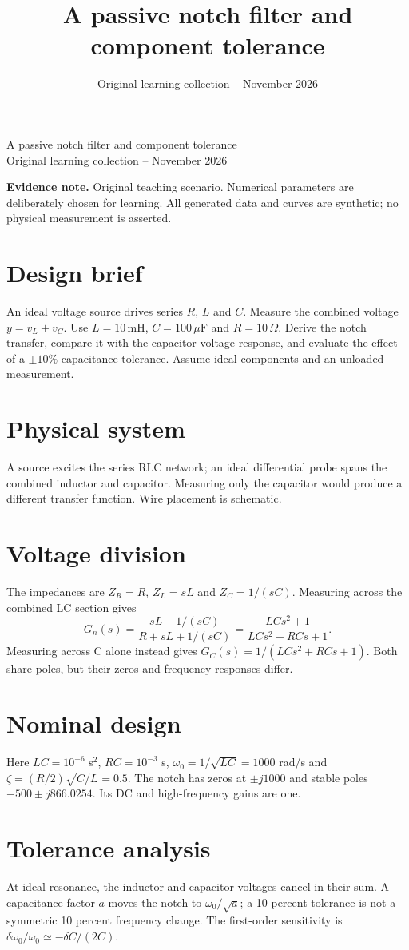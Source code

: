 \documentclass[10pt,a4paper]{article}
\title{\color{ink}A passive notch filter and component tolerance}
\author{}
\date{Original learning collection -- November 2026}
\begin{document}
\begin{center}{\LARGE\color{ink}A passive notch filter and component tolerance}\\[5pt]{\small Original learning collection -- November 2026}\end{center}

\textbf{Evidence note.} Original teaching scenario. Numerical parameters are deliberately chosen for learning. All generated data and curves are synthetic; no physical measurement is asserted.
\section{Design brief}
An ideal voltage source drives series $R$, $L$ and $C$. Measure the combined voltage $y=v_L+v_C$. Use $L=10\,\mathrm{mH}$, $C=100\,\mu\mathrm{F}$ and $R=10\,\Omega$. Derive the notch transfer, compare it with the capacitor-voltage response, and evaluate the effect of a $\pm10\%$ capacitance tolerance. Assume ideal components and an unloaded measurement.
\section{Physical system}
\begin{center}\resizebox{.88\linewidth}{!}{}\par{\small A source excites the series RLC network; an ideal differential probe spans the combined inductor and capacitor. Measuring only the capacitor would produce a different transfer function. Wire placement is schematic.}\end{center}
\section{Voltage division}
The impedances are $Z_R=R$, $Z_L=sL$ and $Z_C=1/(sC)$. Measuring across the combined LC section gives
\[G_n(s)=\frac{sL+1/(sC)}{R+sL+1/(sC)}=\frac{LCs^2+1}{LCs^2+RCs+1}.\]
Measuring across C alone instead gives $G_C(s)=1/(LCs^2+RCs+1)$. Both share poles, but their zeros and frequency responses differ.
\section{Nominal design}
Here $LC=10^{-6}$ s$^2$, $RC=10^{-3}$ s, $\omega_0=1/\sqrt{LC}=1000$ rad/s and $\zeta=(R/2)\sqrt{C/L}=0.5$. The notch has zeros at $\pm j1000$ and stable poles $-500\pm j866.0254$. Its DC and high-frequency gains are one.
\section{Tolerance analysis}
At ideal resonance, the inductor and capacitor voltages cancel in their sum. A capacitance factor $a$ moves the notch to $\omega_0/\sqrt a$; a 10 percent tolerance is not a symmetric 10 percent frequency change. The first-order sensitivity is $\delta\omega_0/\omega_0\simeq-\delta C/(2C)$.
\end{document}
